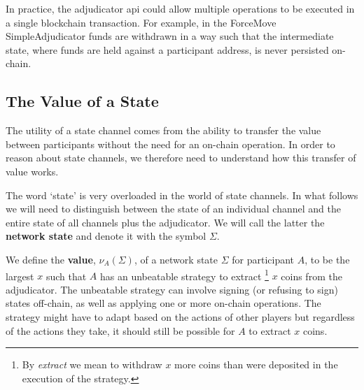 \documentclass{article}
\begin{document}
In practice, the adjudicator api could allow multiple operations to be executed in a single blockchain transaction.
For example, in the ForceMove SimpleAdjudicator funds are withdrawn in a way such that  
the intermediate state, where funds are held against a participant address, is never persisted on-chain.

\subsection{The Value of a State}\label{section:value-of-a-state}

The utility of a state channel comes from the ability to transfer the value
between participants without the need for an on-chain operation.
In order to reason about state channels, we therefore need to understand how this transfer
of value works.

The word `state' is very overloaded in the world of state channels.
In what follows we will need to distinguish between the state of an individual channel and
the entire state of all channels plus the adjudicator.
We will call the latter the \textbf{network state} and denote it with the symbol $\Sigma$.

We define the \textbf{value}, $\nu_A(\Sigma)$, of a network state $\Sigma$ for participant $A$,
to be the largest $x$ such that $A$ has an unbeatable strategy to extract
\footnote{By \textit{extract} we mean to withdraw $x$ more coins than were deposited in the execution of the strategy.}
$x$ coins from the adjudicator.
The unbeatable strategy can involve signing (or refusing to sign) states off-chain, as well as
applying one or more on-chain operations.
The strategy might have to adapt based on the actions of other players but regardless of
the actions they take, it should still be possible for $A$ to extract $x$ coins.
\end{document}
